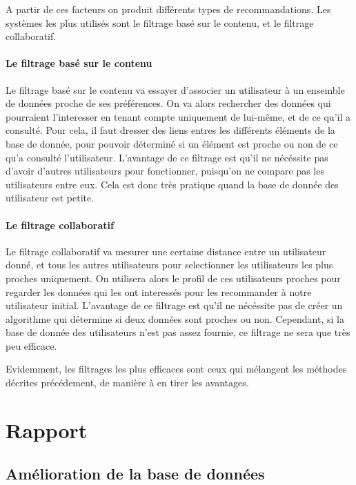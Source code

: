 \documentclass{report}
\begin{document}
A partir de ces facteurs on produit différents types de recommandations.
Les systèmes les plus utilisés sont le filtrage basé sur le contenu, et le filtrage collaboratif.

\subsubsection{Le filtrage basé sur le contenu}
Le filtrage basé sur le contenu va essayer d'associer un utilisateur à un ensemble de données proche de ses préférences. On va alors rechercher des données qui pourraient l'interesser en tenant compte uniquement de lui-même, et de ce qu'il a consulté. Pour cela, il faut dresser des liens entres les différents éléments de la base de donnée, pour pouvoir déterminé si un élément est proche ou non de ce qu'a consulté l'utilisateur.
L'avantage de ce filtrage est qu'il ne nécéssite pas d'avoir d'autres utilisateurs pour fonctionner, puisqu'on ne compare pas les utilisateurs entre eux. Cela est donc très pratique quand la base de donnée des utilisateur est petite.
\subsubsection{Le filtrage collaboratif}
Le filtrage collaboratif va mesurer une certaine distance entre un utilisateur donné, et tous les autres utilisateurs pour selectionner les utilisateurs les plus proches uniquement.
On utilisera alors le profil de ces utilisateurs proches pour regarder les données qui les ont interessés pour les recommander à notre utilisateur initial.
L'avantage de ce filtrage est qu'il ne nécéssite pas de créer un algorithme qui détermine si deux données sont proches ou non. Cependant, si la base de donnée des utilisateurs n'est pas assez fournie, ce filtrage ne sera que très peu efficace.\par
Evidemment, les filtrages les plus efficaces sont ceux qui mélangent les méthodes décrites précédement, de manière à en tirer les avantages.

\chapter{Rapport}

\section{Amélioration de la base de données}
\end{document}
